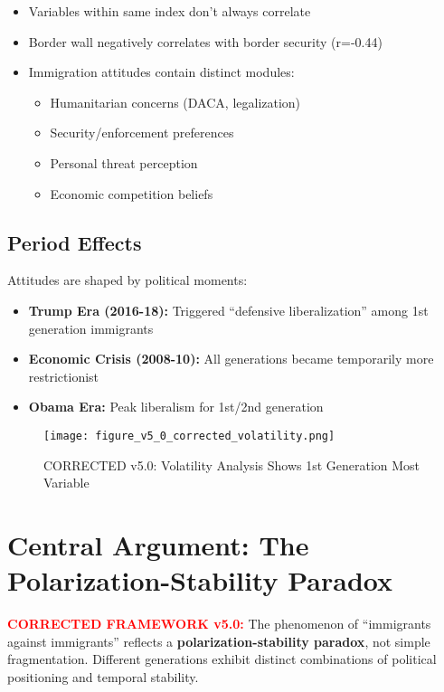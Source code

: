 \documentclass[11pt,letterpaper]{article}
\newcommand{\compactdesc}[2]{\item \textbf{#1:} #2}
\begin{document}
\begin{itemize}
    \item Variables within same index don't always correlate
    \item Border wall negatively correlates with border security (r=-0.44)
    \item Immigration attitudes contain distinct modules:
        \begin{itemize}
            \item Humanitarian concerns (DACA, legalization)
            \item Security/enforcement preferences
            \item Personal threat perception
            \item Economic competition beliefs
        \end{itemize}
\end{itemize}

\subsection{Period Effects}

Attitudes are shaped by political moments:

\begin{itemize}
    \compactdesc{Trump Era (2016-18)}{Triggered ``defensive liberalization'' among 1st generation immigrants}
    \compactdesc{Economic Crisis (2008-10)}{All generations became temporarily more restrictionist}
    \compactdesc{Obama Era}{Peak liberalism for 1st/2nd generation}
\end{itemize}

\begin{figure}[H]
    \centering
    \texttt{[image: figure\_v5\_0\_corrected\_volatility.png]}
    \caption{CORRECTED v5.0: Volatility Analysis Shows 1st Generation Most Variable}
    \label{fig:volatility}
\end{figure}

\section{Central Argument: The Polarization-Stability Paradox}

\textcolor{red}{\textbf{CORRECTED FRAMEWORK v5.0:}} The phenomenon of ``immigrants against immigrants'' reflects a \textbf{polarization-stability paradox}, not simple fragmentation. Different generations exhibit distinct combinations of political positioning and temporal stability.
\end{document}
